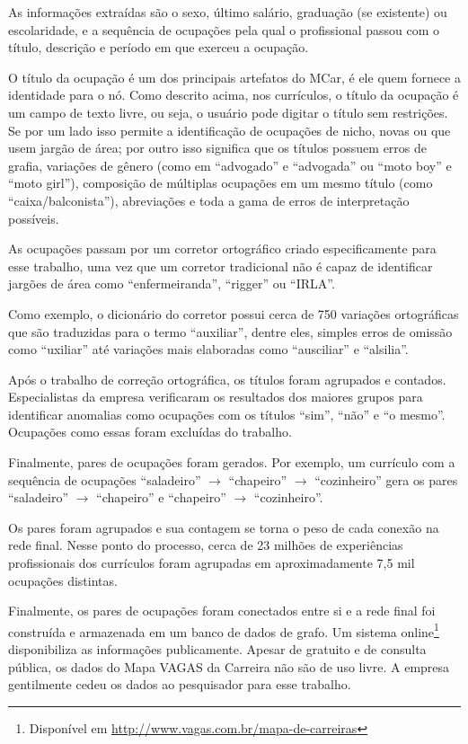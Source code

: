 \documentclass[
  article,
  11pt,
  a4paper,
  english,
  brazil,
  sumario=tradicional]{abntex2}
\begin{document}
As informações extraídas são o sexo, último salário, graduação (se existente) ou escolaridade, e a sequência de ocupações pela qual o profissional passou com o título, descrição e período em que exerceu a ocupação.

O título da ocupação é um dos principais artefatos do MCar, é ele quem fornece a identidade para o nó. Como descrito acima, nos currículos, o título da ocupação é um campo de texto livre, ou seja, o usuário pode digitar o título sem restrições. Se por um lado isso permite a identificação de ocupações de nicho, novas ou que usem jargão de área; por outro isso significa que os títulos possuem erros de grafia, variações de gênero (como em \enquote{advogado} e \enquote{advogada} ou \enquote{moto boy} e \enquote{moto girl}), composição de múltiplas ocupações em um mesmo título (como \enquote{caixa/balconista}), abreviações e toda a gama de erros de interpretação possíveis.

As ocupações passam por um corretor ortográfico criado especificamente para esse trabalho, uma vez que um corretor tradicional não é capaz de identificar jargões de área como \enquote{enfermeiranda}, \enquote{rigger} ou \enquote{IRLA}.

Como exemplo, o dicionário do corretor possui cerca de 750 variações ortográficas que são traduzidas para o termo \enquote{auxiliar}, dentre eles, simples erros de omissão como \enquote{uxiliar} até variações mais elaboradas como \enquote{ausciliar} e \enquote{alsilia}.

Após o trabalho de correção ortográfica, os títulos foram agrupados e contados. Especialistas da empresa verificaram os resultados dos maiores grupos para identificar anomalias como ocupações com os títulos \enquote{sim}, \enquote{não} e \enquote{o mesmo}. Ocupações como essas foram excluídas do trabalho.

Finalmente, pares de ocupações foram gerados. Por exemplo, um currículo com a sequência de ocupações \enquote{saladeiro} $\to$ \enquote{chapeiro} $\to$ \enquote{cozinheiro} gera os pares \enquote{saladeiro} $\to$ \enquote{chapeiro} e \enquote{chapeiro} $\to$ \enquote{cozinheiro}.

Os pares foram agrupados e sua contagem se torna o peso de cada conexão na rede final. Nesse ponto do processo, cerca de 23 milhões de experiências profissionais dos currículos foram agrupadas em aproximadamente 7,5 mil ocupações distintas.

Finalmente, os pares de ocupações foram conectados entre si e a rede final foi construída e armazenada em um banco de dados de grafo. Um sistema online\footnote{Disponível em \url{http://www.vagas.com.br/mapa-de-carreiras}} disponibiliza as informações publicamente. Apesar de gratuito e de consulta pública, os dados do Mapa VAGAS da Carreira não são de uso livre. A empresa gentilmente cedeu os dados ao pesquisador para esse trabalho.
\end{document}
